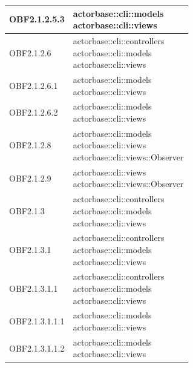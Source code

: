 \documentclass{scalatekids-article}
\begin{document}
\begin{longtable}[H]{|p{6cm}|p{11cm}|}
\hline
OBF2.1.2.5.3 & \multiLineCell[t]{actorbase::cli::models\\actorbase::cli::views\\}\\
\hline
OBF2.1.2.6 & \multiLineCell[t]{actorbase::cli::controllers\\actorbase::cli::models\\actorbase::cli::views\\}\\
\hline
OBF2.1.2.6.1 & \multiLineCell[t]{actorbase::cli::models\\actorbase::cli::views\\}\\
\hline
OBF2.1.2.6.2 & \multiLineCell[t]{actorbase::cli::models\\actorbase::cli::views\\}\\
\hline
OBF2.1.2.8 & \multiLineCell[t]{actorbase::cli::models\\actorbase::cli::views\\actorbase::cli::views::Observer\\}\\
\hline
OBF2.1.2.9 & \multiLineCell[t]{actorbase::cli::views\\actorbase::cli::views::Observer\\}\\
\hline
OBF2.1.3 & \multiLineCell[t]{actorbase::cli::controllers\\actorbase::cli::models\\actorbase::cli::views\\}\\
\hline
OBF2.1.3.1 & \multiLineCell[t]{actorbase::cli::controllers\\actorbase::cli::models\\actorbase::cli::views\\}\\
\hline
OBF2.1.3.1.1 & \multiLineCell[t]{actorbase::cli::controllers\\actorbase::cli::models\\actorbase::cli::views\\}\\
\hline
OBF2.1.3.1.1.1 & \multiLineCell[t]{actorbase::cli::models\\actorbase::cli::views\\}\\
\hline
OBF2.1.3.1.1.2 & \multiLineCell[t]{actorbase::cli::models\\actorbase::cli::views\\}\\

\end{longtable}
\end{document}
